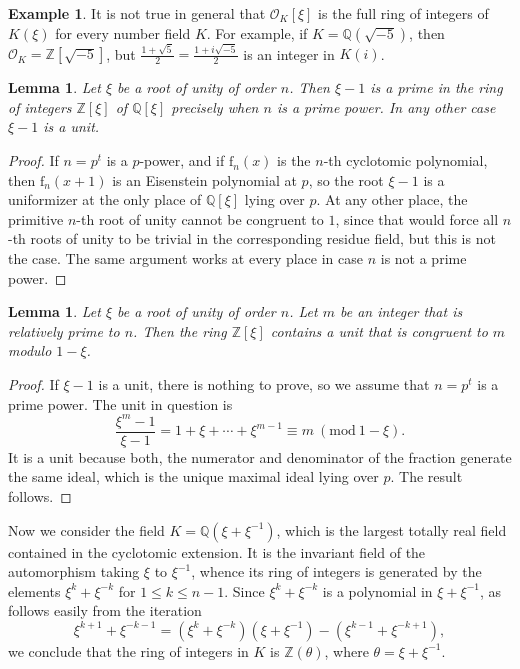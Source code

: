 \documentclass{article}
\newtheorem{Lem}[Prop]{Lemma}
\theoremstyle{definition}
\newtheorem{ex}[Prop]{Example}
\theoremstyle{remark}
\begin{document}
\begin{ex}\label{ec1}
    It is not true in general that $\mathcal{O}_K[\xi]$
    is the full ring of integers of $K(\xi)$ for every 
    number field $K$. For example, if $K=\mathbb{Q}(\sqrt{-5})$,
    then $\mathcal{O}_K=\mathbb{Z}[\sqrt{-5}]$, but
    $\frac{1+\sqrt5}2=\frac{1+i\sqrt{-5}}2$ is an integer
    in $K(i)$.
\end{ex}

\begin{Lem}\label{lc2}
    Let $\xi$ be a root of unity of order $n$. Then
    $\xi-1$ is a prime in the ring of integers
    $\mathbb{Z}[\xi]$ of $\mathbb{Q}[\xi]$ 
    precisely when $n$ is a prime power. In any other case
    $\xi-1$ is a unit.
\end{Lem}

\begin{proof}
    If $n=p^t$ is a $p$-power, and if $\mathrm{f}_n(x)$ is 
    the $n$-th cyclotomic polynomial, then $\mathrm{f}_n(x+1)$
    is an Eisenstein polynomial at $p$, so the root $\xi-1$ is
    a uniformizer at the only place of $\mathbb{Q}[\xi]$ lying
    over $p$. At any other place, the primitive $n$-th root of
    unity cannot be congruent to $1$, since that would force
    all $n$-th roots of unity to be trivial in the 
    corresponding residue field, but this is not the case. 
    The same argument works at every place
    in case $n$ is not a prime power.
\end{proof}

\begin{Lem}\label{lc3}
    Let $\xi$ be a root of unity of order $n$. Let $m$ be an integer
    that is relatively prime to $n$. Then the ring $\mathbb{Z}[\xi]$ 
    contains a unit that is congruent to $m$ modulo $1-\xi$.
\end{Lem}

\begin{proof}
    If $\xi-1$ is a unit, there is nothing to prove, so we assume that
    $n=p^t$ is a prime power. The unit in question is
    $$\frac{\xi^m-1}{\xi-1}=1+\xi+\cdots+\xi^{m-1}\equiv m
    \ (\mathrm{mod}\ 1-\xi).$$
    It is a unit because both, the numerator and denominator of the
    fraction generate the same ideal, which is the unique maximal ideal 
    lying over $p$. The result follows.
\end{proof}

Now we consider the field 
$K=\mathbb{Q}(\xi+\xi^{-1})$, which is the largest totally real field contained in the
cyclotomic extension. It is the invariant
field of the automorphism taking $\xi$
to $\xi^{-1}$, whence its ring of integers 
is generated by the elements $\xi^k+\xi^{-k}$
for $1\leq k\leq n-1$. Since 
$\xi^k+\xi^{-k}$ is a polynomial in
$\xi+\xi^{-1}$, as follows easily from the iteration $$\xi^{k+1}+\xi^{-k-1}=
(\xi^k+\xi^{-k})(\xi+\xi^{-1})-
(\xi^{k-1}+\xi^{-k+1}),$$
we conclude that the ring of integers in $K$ is 
$\mathbb{Z}(\theta)$, where $\theta=\xi+\xi^{-1}$.
\end{document}
